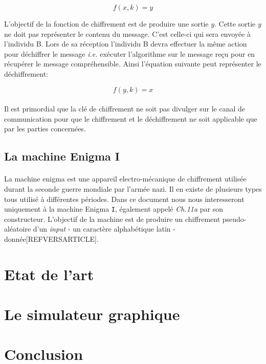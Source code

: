 \documentclass[letterpaper]{article}
\begin{document}
\[
  f(x, k) = y
\]


L'objectif de la fonction de chiffrement est de produire une sortie $y$. Cette sortie $y$
ne doit pas représenter le contenu du message. C'est celle-ci
qui sera envoyée à l'individu B. Lors de sa réception l'individu B devra effectuer la même action
pour déchiffrer le message \textit{i.e.} exécuter l'algorithme sur le message reçu
pour en récupérer le message compréhensible. Ainsi l'équation suivante peut
représenter le déchiffrement:

\[
  f(y, k) = x
\]

\paragraph{}
Il est primordial que la clé de chiffrement ne soit pas divulger sur le canal de communication
pour que le chiffrement et le déchiffrement ne soit applicable que par les parties concernées. 


\subsection{La machine Enigma I}
\paragraph{}
La machine enigma est une appareil electro-mécanique de chiffrement utilisée durant la seconde guerre mondiale
par l'armée nazi. Il en existe de plusieurs types tous utilisé à différentes périodes. Dans ce document nous
nous interesseront uniquement à la machine Enigma \texttt{I}, également appelé \textit{Ch.11a} par son constructeur.
L'objectif de la machine est de produire un chiffrement pseudo-aléatoire d'un \textit{input} - un caractère alphabétique latin - 
donnée[REFVERSARTICLE]. 



\section{}

\section{Etat de l'art}


\section{Le simulateur graphique}

\section{Conclusion}


\footnotesize


\end{document}
